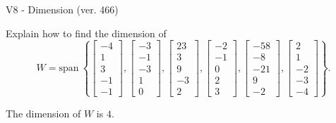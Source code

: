 \begin{exercise}
  \begin{exerciseTitle}V8 - Dimension (ver. 466)\end{exerciseTitle}
  \begin{exerciseStatement}
    Explain how to find the dimension of 
\[W=\mathrm{span}\ \left\{\left[\begin{array}{r}
-4 \\
1 \\
3 \\
-1 \\
-1
\end{array}\right] , \left[\begin{array}{r}
-3 \\
-1 \\
-3 \\
1 \\
0
\end{array}\right] , \left[\begin{array}{r}
23 \\
3 \\
9 \\
-3 \\
2
\end{array}\right] , \left[\begin{array}{r}
-2 \\
-1 \\
0 \\
2 \\
3
\end{array}\right] , \left[\begin{array}{r}
-58 \\
-8 \\
-21 \\
9 \\
-2
\end{array}\right] , \left[\begin{array}{r}
2 \\
1 \\
-2 \\
-3 \\
-4
\end{array}\right]\right\}.\]



  \end{exerciseStatement}
  \begin{exerciseAnswer}
   The dimension of \(W\) is  \(4\).
  


  \end{exerciseAnswer}
\end{exercise}